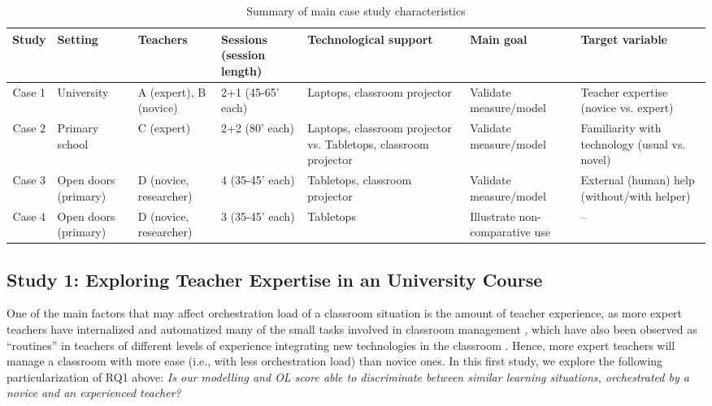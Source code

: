 \documentclass[10pt,journal,compsoc]{IEEEtran}
\begin{document}
\begin{table}[!t]
\caption{Summary of main case study characteristics}
\label{tab:cases}
\centering
\begin{tabular}{|c||p{1.5cm}|p{1.5cm}|p{2cm}|p{3.4cm}|p{2cm}|p{3.4cm}|}
\hline
Study & Setting & Teachers & Sessions (session length) & Technological support & Main goal & Target variable\\
\hline
\hline
Case 1 & University & A (expert), B (novice) & 2+1 (45-65' each) & Laptops, classroom projector & Validate measure/model & Teacher expertise (novice vs. expert) \\
\hline
Case 2 & Primary school & C (expert) & 2+2 (80' each) & Laptops, classroom projector vs. Tabletops, classroom projector & Validate measure/model & Familiarity with technology (usual vs. novel) \\
\hline
Case 3 & Open doors (primary) & D (novice, researcher) & 4 (35-45' each) & Tabletops, classroom projector & Validate measure/model & External (human) help (without/with helper) \\
\hline
Case 4 & Open doors (primary) & D (novice, researcher) & 3 (35-45' each) & Tabletops & Illustrate non-comparative use & -- \\
\hline
\end{tabular}
\end{table}



\subsection{Study 1: Exploring Teacher Expertise in an University Course}
\label{sec:study1}

One of the main factors that may affect orchestration load of a classroom situation is the amount of teacher experience, as more expert teachers have internalized and automatized many of the small tasks involved in classroom management \cite{feldon2007cognitive}, which have also been observed as ``routines'' in teachers of different levels of experience integrating new technologies in the classroom \cite{prieto2011recurrent}. Hence, more expert teachers will manage a classroom with more ease (i.e., with less orchestration load) than novice ones. In this first study, we explore the following particularization of RQ1 above: \textit{Is our modelling and OL score able to discriminate between similar learning situations, orchestrated by a novice and an experienced teacher?}
\end{document}
